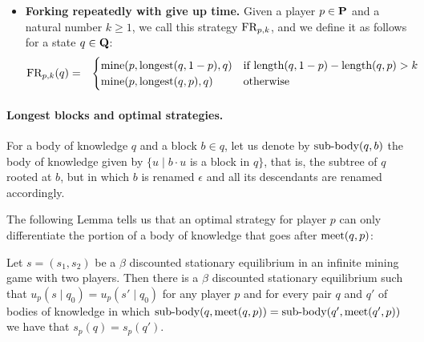 \begin{itemize}
\item {\bf Forking repeatedly with give up time.} Given a player $p \in \mathbf{P}$ and a natural number $k \geq 1$, we call this strategy $\text{\rm FR}_{p,k}$, and we define it as follows for a state $q \in \mathbf{Q}$:
\begin{eqnarray*}
\text{\rm FR}_{p,k}(q) & = &
\begin{cases}
\text{\rm mine}(p,{\text{\rm longest}}(q,1-p),q) & \text{if } \text{\rm length}(q,1-p) - \text{\rm length}(q,p) > k\\
\text{\rm mine}(p,{\text{\rm longest}}(q,p),q) & \text{otherwise}
\end{cases}
\end{eqnarray*}


%
\end{itemize}




\paragraph{Longest blocks and optimal strategies.}
For a body of knowledge $q$ and a block $b \in q$, let us denote by ${\text{\rm sub-body}}(q,b)$ the body of knowledge 
given by $\{u \mid b\cdot u$ is a block in $q\}$, that is, the subtree of $q$ rooted at $b$, but in which $b$ is renamed 
$\epsilon$ and all its descendants are renamed accordingly. 


The following Lemma tells us that an optimal strategy for player $p$ can only differentiate the portion of 
a body of knowledge that goes after $\text{\rm meet}(q,p)$: 

\begin{mylem}
Let $s = (s_1,s_2)$ be a $\beta$ discounted stationary equilibrium in an infinite mining game with two players. 
Then there is a $\beta$ discounted stationary equilibrium such that $u_p(s \mid q_0) = u_p(s' \mid q_0)$ for 
any player $p$ and for every pair $q$ and $q'$ of 
bodies of knowledge in which ${\text{\rm sub-body}}(q,\text{\rm meet}(q,p)) = {\text{\rm sub-body}}(q',\text{\rm meet}(q',p))$ we have that 
$s_p(q) = s_p(q')$. 
\end{mylem}


